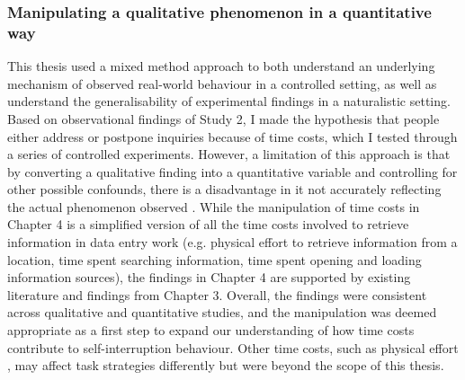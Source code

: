 \subsubsection{Manipulating a qualitative phenomenon in a quantitative way}
This thesis used a mixed method approach to both understand an underlying mechanism of observed real-world behaviour in a controlled setting, as well as understand the generalisability of experimental findings in a naturalistic setting. Based on observational findings of Study 2, I made the hypothesis that people either address or postpone inquiries because of time costs, which I tested through a series of controlled experiments. However, a limitation of this approach is that by converting a qualitative finding into a quantitative variable and controlling for other possible confounds, there is a disadvantage in it not accurately reflecting the actual phenomenon observed \citep{Discroll2007}. While the manipulation of time costs in Chapter 4 is a simplified version of all the time costs involved to retrieve information in data entry work (e.g. physical effort to retrieve information from a location, time spent searching information, time spent opening and loading information sources), the findings in Chapter 4 are supported by existing literature and findings from Chapter 3. Overall, the findings were consistent across qualitative and quantitative studies, and the manipulation was deemed appropriate as a first step to expand our understanding of how time costs contribute to self-interruption behaviour. Other time costs, such as physical effort \citep{Potts2017}, may affect task strategies differently but were beyond the scope of this thesis. 



